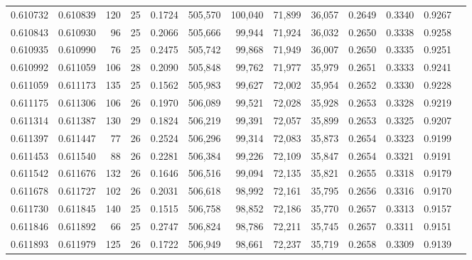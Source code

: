 \begin{tabular}{rrrrrrrrrrrrr}
0.610732 & 0.610839 & 120 &  25 &                                     0.1724 & 505,570 & 100,040 &  71,899 &  36,057 & 0.2649 & 0.3340 & 0.9267 \\
0.610843 & 0.610930 &  96 &  25 &                                     0.2066 & 505,666 &  99,944 &  71,924 &  36,032 & 0.2650 & 0.3338 & 0.9258 \\
0.610935 & 0.610990 &  76 &  25 &                                     0.2475 & 505,742 &  99,868 &  71,949 &  36,007 & 0.2650 & 0.3335 & 0.9251 \\
0.610992 & 0.611059 & 106 &  28 &                                     0.2090 & 505,848 &  99,762 &  71,977 &  35,979 & 0.2651 & 0.3333 & 0.9241 \\
0.611059 & 0.611173 & 135 &  25 &                                     0.1562 & 505,983 &  99,627 &  72,002 &  35,954 & 0.2652 & 0.3330 & 0.9228 \\
0.611175 & 0.611306 & 106 &  26 &                                     0.1970 & 506,089 &  99,521 &  72,028 &  35,928 & 0.2653 & 0.3328 & 0.9219 \\
0.611314 & 0.611387 & 130 &  29 &                                     0.1824 & 506,219 &  99,391 &  72,057 &  35,899 & 0.2653 & 0.3325 & 0.9207 \\
0.611397 & 0.611447 &  77 &  26 &                                     0.2524 & 506,296 &  99,314 &  72,083 &  35,873 & 0.2654 & 0.3323 & 0.9199 \\
0.611453 & 0.611540 &  88 &  26 &                                     0.2281 & 506,384 &  99,226 &  72,109 &  35,847 & 0.2654 & 0.3321 & 0.9191 \\
0.611542 & 0.611676 & 132 &  26 &                                     0.1646 & 506,516 &  99,094 &  72,135 &  35,821 & 0.2655 & 0.3318 & 0.9179 \\
0.611678 & 0.611727 & 102 &  26 &                                     0.2031 & 506,618 &  98,992 &  72,161 &  35,795 & 0.2656 & 0.3316 & 0.9170 \\
0.611730 & 0.611845 & 140 &  25 &                                     0.1515 & 506,758 &  98,852 &  72,186 &  35,770 & 0.2657 & 0.3313 & 0.9157 \\
0.611846 & 0.611892 &  66 &  25 &                                     0.2747 & 506,824 &  98,786 &  72,211 &  35,745 & 0.2657 & 0.3311 & 0.9151 \\
0.611893 & 0.611979 & 125 &  26 &                                     0.1722 & 506,949 &  98,661 &  72,237 &  35,719 & 0.2658 & 0.3309 & 0.9139 \\

\end{tabular}
